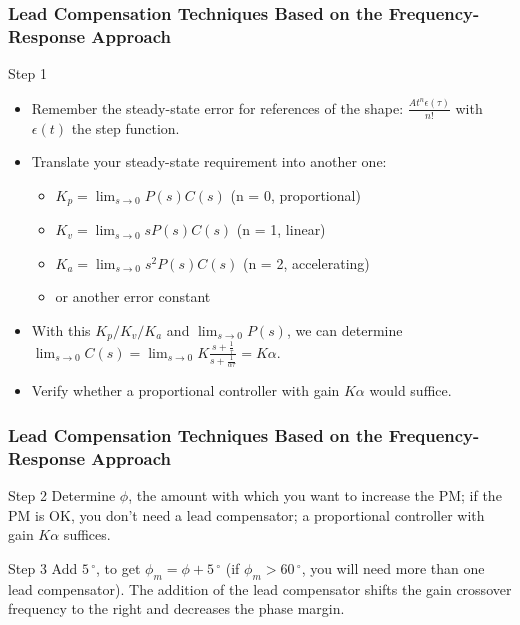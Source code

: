 \begin{frame}
	\frametitle{Lead Compensation Techniques Based on the Frequency-Response Approach}
	\begin{block}{Step 1}
		\begin{itemize}
			\item Remember the steady-state error for references of the shape: $\frac{At^n\epsilon(\tau)}{n!}$ with $\epsilon(t)$ the step function.
			\item Translate your steady-state requirement into another one:
			\begin{itemize}
				\item $K_p = \lim_{s \to 0} P(s)C(s)$ (n = 0, proportional)
				\item $K_v = \lim_{s \to 0} sP(s)C(s)$ (n = 1, linear)
				\item $K_a = \lim_{s \to 0} s^2P(s)C(s)$ (n = 2, accelerating)
				\item or another error constant
			\end{itemize}
			\item With this $K_p/K_v/K_a$ and $\lim_{s \to 0} P(s)$, we can determine $\lim_{s \to 0}C(s) = \lim_{s \to 0} K\frac{s + \frac{1}{\tau}}{s + \frac{1}{\alpha\tau}} = K\alpha$.
			\item Verify whether a proportional controller with gain $K\alpha$ would suffice.
		\end{itemize}
	\end{block}
\end{frame}

\begin{frame}
	\frametitle{Lead Compensation Techniques Based on the Frequency-Response Approach}
	\begin{block}{Step 2}
		Determine $\phi$, the amount with which you want to increase the PM; if the PM is OK, you don’t need a lead compensator; a proportional controller with gain $K\alpha$ suffices.
	\end{block}
	\begin{block}{Step 3}
		Add $5\,^{\circ}$, to get $\phi_m = \phi + 5\,^{\circ}$ (if $\phi_m > 60\,^{\circ}$, you will need more than one lead compensator). The addition of the lead compensator shifts the gain crossover frequency to the right and decreases the
		phase margin.
	\end{block}
\end{frame}


